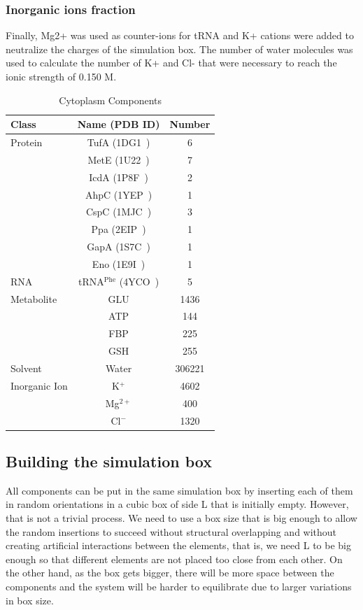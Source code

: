 \documentclass[journal=jacsat,manuscript=article]{achemso}
\begin{document}
\subsubsection{Inorganic ions fraction}
Finally, Mg2+ was used as counter-ions for tRNA and K+ cations were added to neutralize the charges of the simulation box. The number of water molecules was used to calculate the number of K+ and Cl- that were necessary to reach the ionic strength of 0.150 M.



\begin{table}
\centering
\begin{tabular}{lcc}
\hline
Class & Name (PDB ID) & Number\\
\hline
Protein & TufA (1DG1~\cite{Abel1996}) & 6\\
  & MetE (1U22~\cite{Ferrer2004}) & 7\\
  & IcdA (1P8F~\cite{Mesecar2000}) & 2\\
  & AhpC (1YEP~\cite{Parsonage2005}) & 1\\
  & CspC (1MJC~\cite{Schindelin1994}) & 3\\
  & Ppa (2EIP~\cite{Kankare1996}) & 1\\
  & GapA (1S7C~\cite{ShinXXX}) & 1\\
  & Eno (1E9I~\cite{Kuhnel2001}) & 1\\
\hline
RNA & tRNA$^{\text{Phe}}$ (4YCO~\cite{Byrne2015}) & 5\\
\hline
Metabolite & GLU & 1436\\
  & ATP & 144\\
  & FBP & 225\\
  & GSH & 255\\
\hline
Solvent & Water & 306221\\
\hline
Inorganic Ion & K$^{+}$ & 4602\\
  & Mg$^{2+}$ & 400\\
  & Cl$^{-}$ & 1320\\
\hline
\end{tabular}
\caption{Cytoplasm Components}
\label{tbl:soup_components}
\end{table}



\subsection{Building the simulation box}
All components can be put in the same simulation box by inserting each of them in random orientations in a cubic box of side L that is initially empty. However, that is not a trivial process. We need to use a box size that is big enough to allow the random insertions to succeed without structural overlapping and without creating artificial interactions between the elements, that is, we need L to be big enough so that different elements are not placed too close from each other. On the other hand, as the box gets bigger, there will be more space between the components and the system will be harder to equilibrate due to larger variations in box size.
\end{document}
